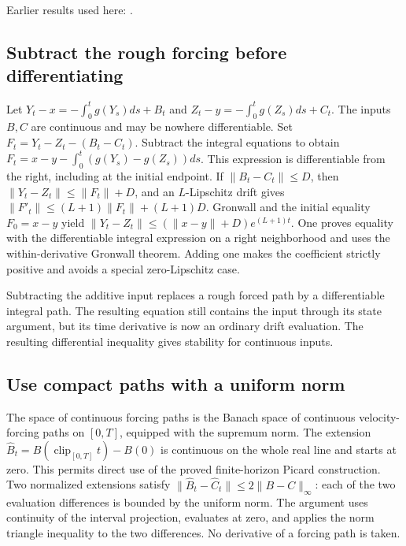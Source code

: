 \documentclass[11pt,a4paper]{report}
\begin{document}
Earlier results used here: \cite[Section~3.43]{LangevinLean2026ULASC}.
\subsection{\texorpdfstring{Subtract the rough forcing before differentiating}{Subtract the rough forcing before differentiating}}
\label{report-step-KineticLangevin-Flow-lean-1}


Let \(Y_t-x=-\int_0^tg(Y_s)ds+B_t\) and \(Z_t-y=-\int_0^tg(Z_s)ds+C_t\). The inputs \(B,C\) are continuous and may be nowhere differentiable. Set \(F_t=Y_t-Z_t-(B_t-C_t)\). Subtract the integral equations to obtain \(F_t=x-y-\int_0^t(g(Y_s)-g(Z_s))ds\). This expression is differentiable from the right, including at the initial endpoint. If \(\|B_t-C_t\|\le D\), then \(\|Y_t-Z_t\|\le\|F_t\|+D\), and an \(L\)-Lipschitz drift gives \(\|F'_t\|\le(L+1)\|F_t\|+(L+1)D\). Gronwall and the initial equality \(F_0=x-y\) yield \(\|Y_t-Z_t\|\le(\|x-y\|+D)e^{(L+1)t}\). One proves equality with the differentiable integral expression on a right neighborhood and uses the within-derivative Gronwall theorem. Adding one makes the coefficient strictly positive and avoids a special zero-Lipschitz case.



Subtracting the additive input replaces a rough forced path by a differentiable integral path. The resulting equation still contains the input through its state argument, but its time derivative is now an ordinary drift evaluation. The resulting differential inequality gives stability for continuous inputs.

\subsection{\texorpdfstring{Use compact paths with a uniform norm}{Use compact paths with a uniform norm}}
\label{report-step-KineticLangevin-Flow-lean-2}


The space of continuous forcing paths is the Banach space of continuous velocity-forcing paths on \([0,T]\), equipped with the supremum norm. The extension \(\widehat B_t=B(\operatorname{clip}_{[0,T]}t)-B(0)\) is continuous on the whole real line and starts at zero. This permits direct use of the proved finite-horizon Picard construction. Two normalized extensions satisfy \(\|\widehat B_t-\widehat C_t\|\le2\|B-C\|_\infty\): each of the two evaluation differences is bounded by the uniform norm. The argument uses continuity of the interval projection, evaluates at zero, and applies the norm triangle inequality to the two differences. No derivative of a forcing path is taken.
\end{document}
